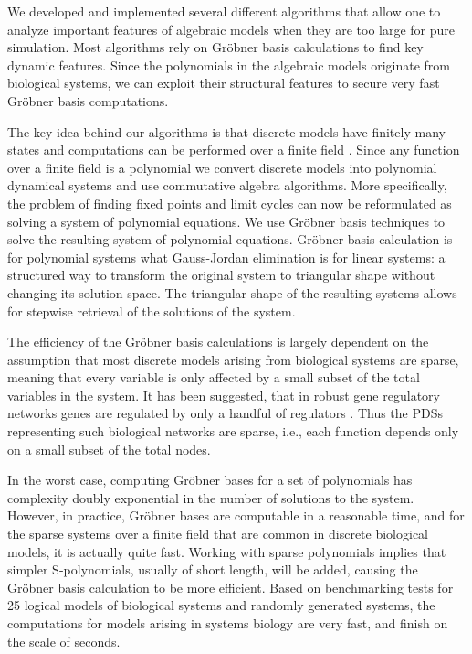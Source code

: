 \documentclass[11pt]{amsart}
\begin{document}
We developed and implemented several different algorithms that allow one to analyze
important features of algebraic models when they are too large for pure simulation.
Most algorithms rely on Gr\"obner basis calculations to find key dynamic
features.
Since the polynomials in the algebraic
models originate from biological systems, we can exploit their structural
features to secure very fast Gr\"obner basis computations.
 
The key idea behind our algorithms is that discrete models have finitely many states and computations
can be performed over a finite field \cite{Alan:Bioinf2010,
Hinkelmann:2010}. Since any function over a finite field is a polynomial
\cite{Lidl:1997} we convert discrete models into polynomial dynamical systems
and use commutative algebra algorithms. More specifically, the problem of finding fixed points and limit cycles
can now be reformulated as solving a system of polynomial equations. We use Gr\"{o}bner basis techniques to solve the
resulting system of polynomial equations. Gr\"obner basis calculation is for polynomial systems what
Gauss-Jordan elimination is for linear systems: a structured way to transform
the original system to triangular shape without changing its solution space.
The triangular shape of the resulting systems allows for stepwise retrieval of the solutions of the system.
 
The efficiency of the Gr\"obner basis calculations is largely dependent on the
assumption that most discrete models arising from biological systems are
sparse, meaning that every variable is only affected by a small subset of the
total variables in the system. It has been suggested, that in robust gene
regulatory networks genes are regulated by only a handful of regulators
\cite{Leclerc:2008}. Thus the PDSs representing such biological networks are
sparse, i.e., each function depends only on a small subset of the total nodes.
 
In the worst case, computing Gr\"obner bases for a set of polynomials has 
complexity doubly exponential in the number of solutions to the system.
However, in practice, Gr\"{o}bner bases are computable in a reasonable time, and
for the sparse systems over a finite field that are common in discrete
biological models, it is actually quite fast.
Working with sparse polynomials implies that simpler
S-polynomials, usually of short length, will be added, causing the Gr\"{o}bner
basis calculation to be more efficient. Based on benchmarking tests for
25 logical models of biological systems \cite{GINsimRepo}
and randomly generated systems,
the computations for models arising in systems biology are very fast, and finish on the scale of
seconds.
 
\end{document}
